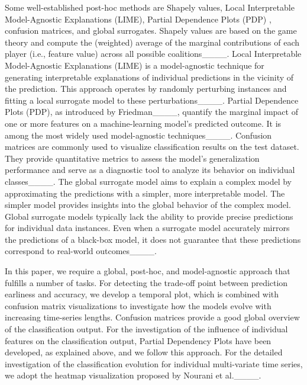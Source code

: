 Some well-established post-hoc methods are Shapely values, Local Interpretable Model-Agnostic Explanations (LIME), Partial Dependence Plots (PDP) , confusion matrices, and global surrogates.
Shapely values are based on the game theory and compute the (weighted) average of the marginal contributions of each player (i.e., feature value) across all possible coalitions____. 
Local Interpretable Model-Agnostic Explanations (LIME) is a model-agnostic technique for generating interpretable explanations of individual predictions in the vicinity of the prediction. This approach operates by randomly perturbing instances and fitting a local surrogate model to these perturbations____.
Partial Dependence Plots (PDP), as introduced by Friedman____, quantify the marginal impact of one or more features on a machine-learning model's predicted outcome. It is among the most widely used model-agnostic techniques____.
Confusion matrices are commonly used to visualize classification results on the test dataset. They provide quantitative metrics to assess the model's generalization performance and serve as a diagnostic tool to analyze its behavior on individual classes____.
The global surrogate model aims to explain a complex model by approximating the predictions with a simpler, more interpretable model. The simpler model provides insights into the global behavior of the complex model. Global surrogate models typically lack the ability to provide precise predictions for individual data instances. Even when a surrogate model accurately mirrors the predictions of a black-box model, it does not guarantee that these predictions correspond to real-world outcomes____.

In this paper, we require a global, post-hoc, and model-agnostic approach that fulfills a number of tasks. For detecting the trade-off point between prediction earliness and accuracy, we develop a temporal plot, which is combined with confusion matrix visualizations to investigate how the models evolve with increasing time-series lengths. Confusion matrices provide a good global overview of the classification output. For the investigation of the influence of individual features on the classification output, Partial Dependency Plots have been developed, as explained above, and we follow this approach. For the detailed investigation of the classification evolution for individual multi-variate time series, we adopt the heatmap visualization proposed by Nourani et al.____.